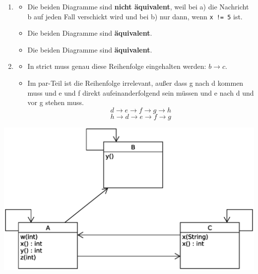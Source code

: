 \documentclass[a4paper, 12pt, margins=2.5cm]{homework}
\begin{document}
  \begin{problem}
    
  \end{problem}
  \begin{solution} \hfill
    \begin{enumerate}[label=\alph*)]\itemsep0pt
      \item
        \begin{itemize}  
          \item Die beiden Diagramme sind \textbf{nicht äquivalent}, weil bei a) die
                Nachricht b auf jeden Fall verschickt wird und bei b) nur dann, wenn
                \texttt{x != 5} ist.

          \item Die beiden Diagramme sind \textbf{äquivalent}.

          \item Die beiden Diagramme sind \textbf{äquivalent}.
        \end{itemize}

      \item 
        \begin{itemize}
          \item In strict muss genau diese Reihenfolge eingehalten werden: $b\rightarrow c$.
          \item Im par-Teil ist die Reihenfolge irrelevant, außer dass g nach d
                kommen muss und e und f direkt aufeinanderfolgend sein müssen und
                e nach d und vor g stehen muss.
                \[ d\rightarrow e\rightarrow f\rightarrow g\rightarrow h \]
                \[ h\rightarrow d\rightarrow e\rightarrow f\rightarrow g  \]
        \end{itemize}
    \end{enumerate}
  \end{solution}

\newpage

  \begin{problem}
    
  \end{problem}
  \begin{solution}\hfill
    \begin{center}
      \includegraphics[scale=0.6]{Aufgabe5.eps}
    \end{center}
  \end{solution}
\end{document}
